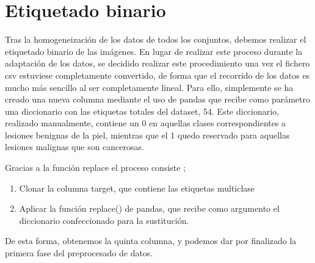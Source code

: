  \section{Etiquetado binario}
 
 Tras la homogeneización de los datos de todos los conjuntos, debemos realizar el etiquetado binario de las imágenes. En lugar de realizar este proceso durante la adaptación de los datos, se decidido realizar este procedimiento una vez el fichero csv estuviese completamente convertido, de forma que el recorrido de los datos es mucho más sencillo al ser completamente lineal. Para ello, simplemente se ha creado una nueva columna mediante el uso de pandas que recibe como parámetro una diccionario con las etiquetas totales del dataset, 54.  Este diccionario, realizado manualmente, contiene un 0 en aquellas clases correspondientes a lesiones benignas de la piel, mientras que el 1 quedo reservado para aquellas lesiones malignas que son cancerosas.
 
 Gracias a la función replace el proceso consiste ;
 
 \begin{enumerate}
 	\item Clonar la columna target, que contiene las etiquetas multiclase
 	\item Aplicar la función replace() de pandas, que recibe como argumento el diccionario confeccionado para la sustitución.
\end{enumerate}

De esta forma, obtenemos la quinta columna, y podemos dar por finalizado la primera fase del preprocesado de datos.